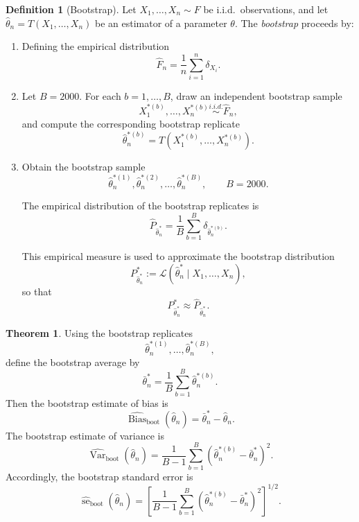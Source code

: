 \documentclass[11pt]{article}
\theoremstyle{definition}
\newtheorem{defn}{Definition}[section]
\newtheorem{theo}{Theorem}[section]
\begin{document}
\begin{defn}[Bootstrap]
Let $X_1,\dots,X_n \sim F$ be i.i.d.\ observations, and let $\hat\theta_n = T(X_1,\dots,X_n)$ be an estimator of a parameter $\theta$.
The \emph{bootstrap} proceeds by:
\begin{enumerate}
\item Defining the empirical distribution
\[
\hat F_n = \frac{1}{n}\sum_{i=1}^n \delta_{X_i}.
\]
\item Let $B=2000$. For each $b=1,\dots,B$, draw an independent bootstrap sample
\[
X_1^{*(b)},\dots,X_n^{*(b)} \overset{i.i.d.}{\sim} \hat F_n,
\]
and compute the corresponding bootstrap replicate
\[
\hat\theta_n^{*(b)} = T\!\left(X_1^{*(b)},\dots,X_n^{*(b)}\right).
\]

\item Obtain the bootstrap sample
\[
\hat\theta_n^{*(1)},\hat\theta_n^{*(2)},\dots,\hat\theta_n^{*(B)},
\qquad B=2000.
\]

The empirical distribution of the bootstrap replicates is
\[
\hat P_{\hat\theta_n^*}
=
\frac{1}{B}\sum_{b=1}^B \delta_{\hat\theta_n^{*(b)}}.
\]

This empirical measure is used to approximate the bootstrap distribution
\[
P^*_{\hat\theta_n^*}
:=
\mathcal{L}\!\left(\hat\theta_n^* \mid X_1,\dots,X_n\right),
\]
so that
\[
P^*_{\hat\theta_n^*} \approx \hat P_{\hat\theta_n^*}.
\]
\end{enumerate}
\end{defn}
\begin{theo}
    Using the bootstrap replicates
\[
\hat\theta_n^{*(1)},\dots,\hat\theta_n^{*(B)},
\]
define the bootstrap average by
\[
\bar{\theta}_n^*
=
\frac{1}{B}\sum_{b=1}^B \hat\theta_n^{*(b)}.
\]
Then the bootstrap estimate of bias is
\[
\widehat{\operatorname{Bias}}_{\mathrm{boot}}(\hat\theta_n)
=
\bar{\theta}_n^*-\hat\theta_n.
\]
The bootstrap estimate of variance is
\[
\widehat{\operatorname{Var}}_{\mathrm{boot}}(\hat\theta_n)
=
\frac{1}{B-1}\sum_{b=1}^B
\left(\hat\theta_n^{*(b)}-\bar{\theta}_n^*\right)^2.
\]
Accordingly, the bootstrap standard error is
\[
\widehat{\operatorname{se}}_{\mathrm{boot}}(\hat\theta_n)
=
\left[
\frac{1}{B-1}\sum_{b=1}^B
\left(\hat\theta_n^{*(b)}-\bar{\theta}_n^*\right)^2
\right]^{1/2}.
\]
\end{theo}
\end{document}
